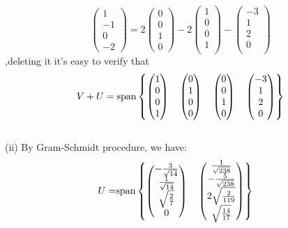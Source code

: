 \documentclass[12pt]{article}
\begin{document}
\[
\begin{pmatrix}
1\\
-1\\
0\\
-2
\end{pmatrix}
=
2
\begin{pmatrix}
0 \\
0 \\
1 \\
0
\end{pmatrix}
-
2
\begin{pmatrix}
1 \\
0 \\
0 \\
1 \\
\end{pmatrix}
-
\begin{pmatrix}
-3 \\
1 \\
2 \\
0 \\
\end{pmatrix}
\]
,deleting it it's easy to verify that
\begin{align*}
V + U= {\rm span}\left\{
\begin{pmatrix}
1 \\
0 \\
0 \\
1 \\
\end{pmatrix}
\quad
\begin{pmatrix}
0 \\
1 \\
0 \\
0
\end{pmatrix}
\quad
\begin{pmatrix}
0 \\
0 \\
1 \\
0
\end{pmatrix}
\quad
\begin{pmatrix}
-3 \\
1 \\
2 \\
0 \\
\end{pmatrix}
\right\}
\end{align*}\\[0.5 em]
(ii) By Gram-Schmidt procedure, we have:
\begin{align*}
U= &{\rm span}\left\{
\begin{pmatrix}
-\frac{3}{\sqrt{14}} \\
\frac{1}{\sqrt{14}} \\
\sqrt{\frac{2}{7}} \\
0 \\
\end{pmatrix}
\quad
\begin{pmatrix}
\frac{1}{\sqrt{238}} \\
-\frac{5}{\sqrt{238}} \\
2\sqrt{\frac{2}{119}} \\
\sqrt{\frac{14}{17}}
\end{pmatrix}
\right\}
\end{align*}
\end{document}
